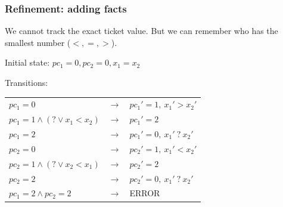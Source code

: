 \documentclass{beamer}
\begin{document}
\begin{frame}
  \frametitle{Refinement: adding facts}
  We cannot track the exact ticket value.
  But we can remember who has the smallest number ($<,=,>$).
  
  \vfill

  Initial state: $pc_1 = 0, pc_2 = 0, x_1 = x_2$
 
  \vspace{10pt}

  Transitions:

  \begin{tabular}{lcl}
    $pc_1=0$ & $\rightarrow$ & $pc_1'=1,~ x_1' > x_2'$ \\
    $pc_1=1 \land (? \lor x_1 < x_2)$ & $\rightarrow$ & $pc_1'=2$ \\
    $pc_1=2$ & $\rightarrow$ & $pc_1' = 0,~ x_1' ~?~ x_2'$ \\
    $pc_2=0$ & $\rightarrow$ & $pc_2'=1,~  x_1' < x_2'$ \\
    $pc_2=1 \land (? \lor x_2 < x_1)$ & $\rightarrow$ & $pc_2'=2$ \\
    $pc_2=2$ & $\rightarrow$ & $pc_2' = 0,~ x_1' ~?~ x_2'$ \\
    $pc_1=2 \land pc_2=2$ & $\rightarrow$ & ERROR
  \end{tabular}

\end{frame}
\end{document}
